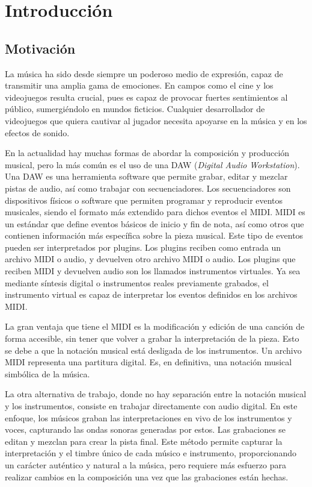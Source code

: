 \chapter{Introducción}
\label{cap:introduccion}



\section{Motivación}
La música ha sido desde siempre un poderoso medio de expresión, capaz de transmitir una amplia gama de emociones. En campos como el cine y los videojuegos resulta crucial, pues es capaz de provocar fuertes sentimientos al público, sumergiéndolo en mundos ficticios. Cualquier desarrollador de videojuegos que quiera cautivar al jugador necesita apoyarse en la música y en los efectos de sonido.

En la actualidad hay muchas formas de abordar la composición y producción musical, pero la más común es el uso de una DAW (\textit{Digital Audio Workstation}). Una DAW es una herramienta software que permite grabar, editar y mezclar pistas de audio, así como trabajar con secuenciadores. Los secuenciadores son dispositivos físicos o software que permiten programar y reproducir eventos musicales, siendo el formato más extendido para dichos eventos el MIDI. MIDI es un estándar que define eventos básicos de inicio y fin de nota, así como otros que contienen información más específica sobre la pieza musical. Este tipo de eventos pueden ser interpretados por plugins. Los plugins reciben como entrada un archivo MIDI o audio, y devuelven otro archivo MIDI o audio. Los plugins que reciben MIDI y devuelven audio son los llamados instrumentos virtuales. Ya sea mediante síntesis digital o instrumentos reales previamente grabados, el instrumento virtual es capaz de interpretar los eventos definidos en los archivos MIDI. 

La gran ventaja que tiene el MIDI es la modificación y edición de una canción de forma accesible, sin tener que volver a grabar la interpretación de la pieza. Esto se debe a que la notación musical está desligada de los instrumentos. Un archivo MIDI representa una partitura digital. Es, en definitiva, una notación musical simbólica de la música.

La otra alternativa de trabajo, donde no hay separación entre la notación musical y los instrumentos, consiste en trabajar directamente con audio digital. En este enfoque, los músicos graban las interpretaciones en vivo de los instrumentos y voces, capturando las ondas sonoras generadas por estos. Las grabaciones se editan y mezclan para crear la pista final. Este método permite capturar la interpretación y el timbre único de cada músico e instrumento, proporcionando un carácter auténtico y natural a la música, pero requiere más esfuerzo para realizar cambios en la composición una vez que las grabaciones están hechas.

